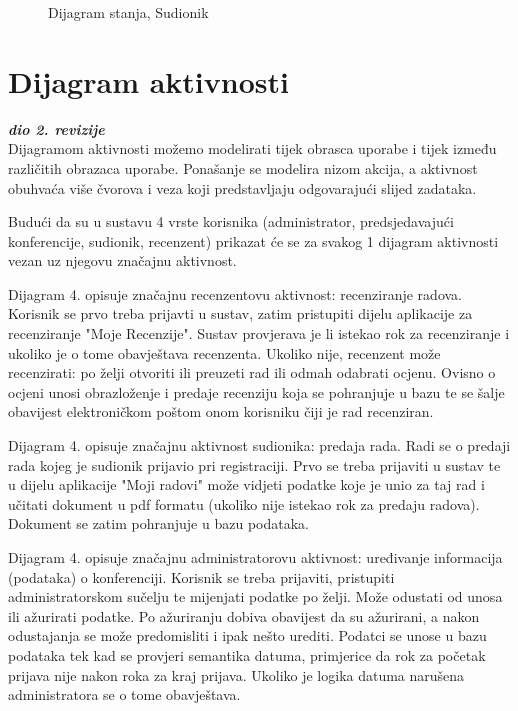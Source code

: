 \begin{figure}[H]
				\centering
				\caption{Dijagram stanja, Sudionik}
				\label{fig:stanje1}
			\end{figure}
			
			
			
			
			
			
			\eject 
		
		\section{Dijagram aktivnosti}
			
			\textbf{\textit{dio 2. revizije}}\\
			
			 Dijagramom aktivnosti možemo modelirati tijek obrasca uporabe i tijek između različitih obrazaca uporabe. Ponašanje se modelira nizom akcija, a aktivnost obuhvaća više čvorova i veza koji predstavljaju odgovarajući slijed zadataka.
			 
			 Budući da su u sustavu 4 vrste korisnika (administrator, predsjedavajući konferencije, sudionik, recenzent) prikazat će se za svakog 1 dijagram aktivnosti vezan uz njegovu značajnu aktivnost.
			 
			 Dijagram 4. opisuje značajnu recenzentovu aktivnost: recenziranje radova. Korisnik se prvo treba prijavti u sustav, zatim pristupiti dijelu aplikacije za recenziranje "Moje Recenzije". Sustav provjerava je li istekao rok za recenziranje i ukoliko je o tome obavještava recenzenta. Ukoliko nije, recenzent može recenzirati: po želji otvoriti ili preuzeti rad ili odmah odabrati ocjenu. Ovisno o ocjeni unosi obrazloženje i predaje recenziju koja se pohranjuje u bazu te se šalje obavijest elektroničkom poštom onom korisniku čiji je rad recenziran.
			 
			 Dijagram 4. opisuje značajnu aktivnost sudionika: predaja rada. Radi se o predaji rada kojeg je sudionik prijavio pri registraciji. Prvo se treba prijaviti u sustav te u dijelu aplikacije "Moji radovi" može vidjeti podatke koje je unio za taj rad i učitati dokument u pdf formatu (ukoliko nije istekao rok za predaju radova). Dokument se zatim pohranjuje u bazu podataka.
			 
			 Dijagram 4. opisuje značajnu administratorovu aktivnost: uređivanje informacija (podataka) o konferenciji. Korisnik se treba prijaviti, pristupiti administratorskom sučelju te mijenjati podatke po želji. Može odustati od unosa ili ažurirati podatke. Po ažuriranju dobiva obavijest da su ažurirani, a nakon odustajanja se može predomisliti i ipak nešto urediti. Podatci se unose u bazu podataka tek kad se provjeri semantika datuma, primjerice da rok za početak prijava nije nakon roka za kraj prijava. Ukoliko je logika datuma narušena administratora se o tome obavještava.
			 
